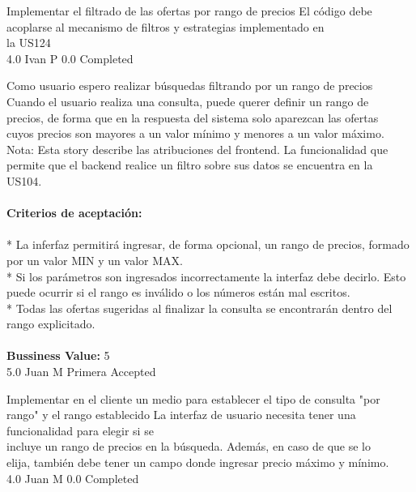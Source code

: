 		{Implementar el filtrado de las ofertas por rango de precios} %
		{El código debe acoplarse al mecanismo de filtros y estrategias implementado en\\
la US124\\
} %
		{4.0} %
		{Ivan P} %
		{0.0} %
		{Completed} %


\vspace{20pt}

	{Como usuario espero realizar búsquedas filtrando por un rango de precios} %
	{Cuando el usuario realiza una consulta, puede querer definir un rango de\\
precios, de forma que en la respuesta del sistema solo aparezcan las ofertas\\
cuyos precios son mayores a un valor mínimo y menores a un valor máximo.\\
Nota: Esta story describe las atribuciones del frontend. La funcionalidad que\\
permite que el backend realice un filtro sobre sus datos se encuentra en la\\
US104.\\
  \\
\textbf{Criterios de aceptación:}\\
  \\
* La inferfaz permitirá ingresar, de forma opcional, un rango de precios, formado por un valor MIN y un valor MAX.  \\
* Si los parámetros son ingresados incorrectamente la interfaz debe decirlo. Esto puede ocurrir si el rango es inválido o los números están mal escritos.\\
* Todas las ofertas sugeridas al finalizar la consulta se encontrarán dentro del rango explicitado.  \\
  \\
\textbf{Bussiness Value:} 5\\
} %
	{} %
	{5.0} %
	{Juan M} %
	{Primera} %
	{Accepted} %

		{Implementar en el cliente un medio para establecer el tipo de consulta "por rango" y el rango establecido} %
		{La interfaz de usuario necesita tener una funcionalidad para elegir si se\\
incluye un rango de precios en la búsqueda. Además, en caso de que se lo\\
elija, también debe tener un campo donde ingresar precio máximo y mínimo.\\
} %
		{4.0} %
		{Juan M} %
		{0.0} %
		{Completed} %

